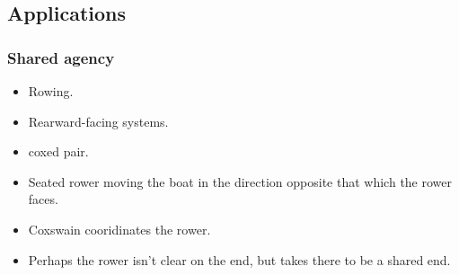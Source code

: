 \documentclass[10pt]{article}
\begin{document}
\subsection{Applications}
\label{sec:applications}

\subsubsection{Shared agency}
\label{sec:shared-agency-1}






\begin{itemize}
  \item Rowing.
  \item Rearward-facing systems.
  \item coxed pair.
  \item Seated rower moving the boat in the direction opposite that which the rower faces.
  \item Coxswain cooridinates the rower.
  \item Perhaps the rower isn't clear on the end, but takes there to be a shared end.
  \end{itemize}


  \begin{center}
\end{center}
\end{document}
